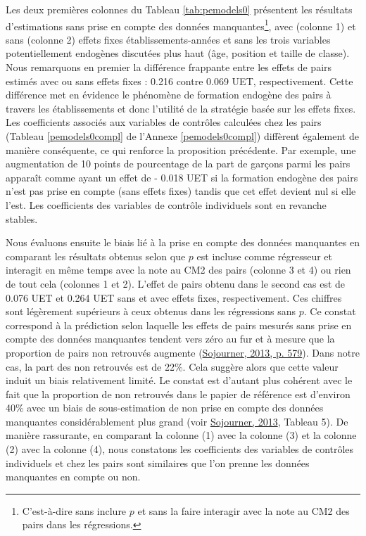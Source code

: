 \documentclass[
]{book}
\begin{document}
\quad Les deux premières colonnes du Tableau \ref{tab:pemodels0} présentent les résultats d'estimations sans prise en compte des données manquantes\footnote{C'est-à-dire sans inclure \(p\) et sans la faire interagir avec la note au CM2 des pairs dans les régressions.}, avec (colonne 1) et sans (colonne 2) effets fixes établissements-années et sans les trois variables potentiellement endogènes discutées plus haut (âge, position et taille de classe). Nous remarquons en premier la différence frappante entre les effets de pairs estimés avec ou sans effets fixes : 0.216 contre 0.069 UET, respectivement. Cette différence met en évidence le phénomène de formation endogène des pairs à travers les établissements et donc l'utilité de la stratégie basée sur les effets fixes. Les coefficients associés aux variables de contrôles calculées chez les pairs (Tableau \ref{pemodels0compl} de l'Annexe \ref{pemodels0compl}) diffèrent également de manière conséquente, ce qui renforce la proposition précédente. Par exemple, une augmentation de 10 points de pourcentage de la part de garçons parmi les pairs apparaît comme ayant un effet de - 0.018 UET si la formation endogène des pairs n'est pas prise en compte (sans effets fixes) tandis que cet effet devient nul si elle l'est. Les coefficients des variables de contrôle individuels sont en revanche stables.

\quad Nous évaluons ensuite le biais lié à la prise en compte des données manquantes en comparant les résultats obtenus selon que \(p\) est incluse comme régresseur et interagit en même temps avec la note au CM2 des pairs (colonne 3 et 4) ou rien de tout cela (colonnes 1 et 2). L'effet de pairs obtenu dans le second cas est de 0.076 UET et 0.264 UET sans et avec effets fixes, respectivement. Ces chiffres sont légèrement supérieurs à ceux obtenus dans les régressions sans \(p\). Ce constat correspond à la prédiction selon laquelle les effets de pairs mesurés sans prise en compte des données manquantes tendent vers zéro au fur et à mesure que la proportion de pairs non retrouvés augmente (\protect\hyperlink{ref-SOJ:13}{Sojourner, 2013, p. 579}). Dans notre cas, la part des non retrouvés est de 22\%. Cela suggère alors que cette valeur induit un biais relativement limité. Le constat est d'autant plus cohérent avec le fait que la proportion de non retrouvés dans le papier de référence est d'environ 40\% avec un biais de sous-estimation de non prise en compte des données manquantes considérablement plus grand (voir \protect\hyperlink{ref-SOJ:13}{Sojourner, 2013}, Tableau 5).
De manière rassurante, en comparant la colonne (1) avec la colonne (3) et la colonne (2) avec la colonne (4), nous constatons les coefficients des variables de contrôles individuels et chez les pairs sont similaires que l'on prenne les données manquantes en compte ou non.
\end{document}
